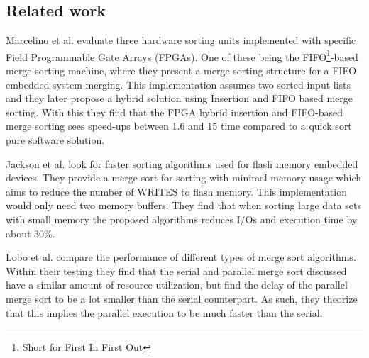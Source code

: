 \subsection{Related work}
Marcelino et al. \cite{sorting_units} evaluate three hardware sorting units
implemented with specific Field Programmable Gate Arrays (FPGAs). One of these
being the FIFO\footnote{Short for First In First Out}-based merge sorting
machine, where they present a merge sorting structure for a FIFO embedded system
merging. This implementation assumes two sorted input lists and they later
propose a hybrid solution using Insertion and FIFO based merge sorting. With
this they find that the FPGA hybrid insertion and FIFO-based merge sorting sees
speed-ups between 1.6 and 15 time compared to a quick sort pure software
solution.

Jackson et al. \cite{flash_sorting} look for faster sorting algorithms used for
flash memory embedded devices. They provide a merge sort for sorting with
minimal memory usage which aims to reduce the number of WRITES to flash memory.
This implementation would only need two memory buffers. They find that when
sorting large data sets with small memory the proposed algorithms reduces I/Os
and execution time by about 30\%.

Lobo et al. \cite{merge_sort} compare the performance of different types of
merge sort algorithms. Within their testing they find that the serial and
parallel merge sort discussed have a similar amount of resource
utilization, but find the delay of the parallel merge sort to be a lot smaller
than the serial counterpart. As such, they theorize that this implies the
parallel execution to be much faster than the serial.
